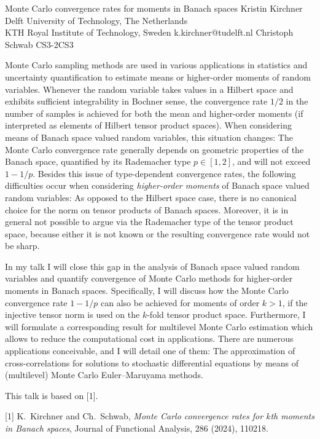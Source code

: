 \begin{talk}
  {Monte Carlo convergence rates for moments in Banach spaces}%
  {Kristin Kirchner}%
  {Delft University of Technology, The Netherlands \\ 
  KTH Royal Institute of Technology, Sweden}%
  {k.kirchner@tudelft.nl}%
  {Christoph Schwab}%
{}{}{CS3-2}{CS3}




Monte Carlo sampling methods are used in various applications in statistics and uncertainty quantification to estimate means or higher-order moments of random variables. Whenever the random variable takes values in a Hilbert space and exhibits sufficient integrability in Bochner sense, the convergence rate $1/2$ in the number of samples is achieved for both the mean and higher-order moments (if interpreted as elements of Hilbert tensor product spaces). When considering means of Banach space valued random variables, this situation changes: The Monte Carlo convergence rate generally depends on geometric properties of the Banach space, quantified by its Rademacher type $p\in[1,2]$, and will not exceed $1 - 1/p$. Besides this issue of type-dependent convergence rates, the following difficulties occur when considering \emph{higher-order moments} of Banach space valued random variables: As opposed to the Hilbert space case, there is no canonical choice for the norm on tensor products of Banach spaces. Moreover, it is in general not possible to argue via the Rademacher type of the tensor product space, because either it is not known or the resulting convergence rate would not be sharp. 

In my talk I will close this gap in the analysis of Banach space valued random variables and quantify convergence of Monte Carlo methods for higher-order moments in Banach spaces. Specifically, I will discuss how the Monte Carlo convergence rate $1 - 1/p$ can also be achieved for moments of order $k > 1$, if the injective tensor norm is used on the $k$-fold tensor product space. Furthermore, I will formulate a corresponding result for multilevel Monte Carlo estimation which allows to reduce the computational cost in applications.  
There are numerous applications conceivable, and I will detail one of them: The approximation of cross-correlations for solutions to stochastic differential equations by means of (multilevel) Monte Carlo Euler--Maruyama methods.

This talk is based on [1]. 

\medskip

[1] K.~Kirchner and Ch.~Schwab, 
\emph{Monte Carlo convergence rates for $k$th moments in Banach spaces},  
Journal of Functional Analysis, 286 (2024), 110218.
\end{talk}

